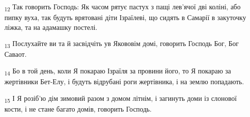 \begin{tcolorbox}
\textsubscript{12} Так говорить Господь: Як часом рятує пастух з пащі лев'ячої дві коліні, або пипку вуха, так будуть врятовані діти Ізраїлеві, що сидять в Самарії в закуточку ліжка, та на адамашку постелі.
\end{tcolorbox}
\begin{tcolorbox}
\textsubscript{13} Послухайте ви та й засвідчіть ув Якововім домі, говорить Господь Бог, Бог Саваот.
\end{tcolorbox}
\begin{tcolorbox}
\textsubscript{14} Бо в той день, коли Я покараю Ізраїля за провини його, то Я покараю за жертівники Бет-Елу, і будуть відрубані роги жертівника, і на землю попадають.
\end{tcolorbox}
\begin{tcolorbox}
\textsubscript{15} І Я розіб'ю дім зимовий разом з домом літнім, і загинуть доми із слонової кости, і не стане багато домів, говорить Господь.
\end{tcolorbox}
